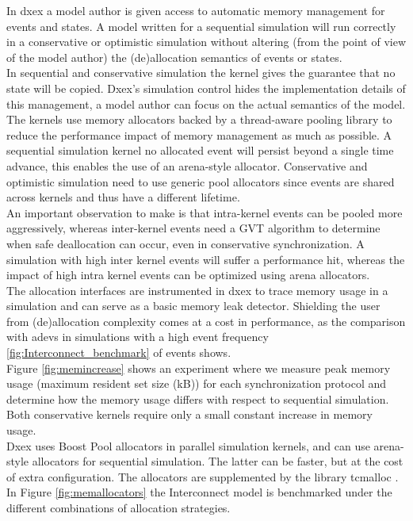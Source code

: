 In dxex a model author is given access to automatic memory management for events and states. A model written for a sequential simulation will run correctly in a conservative or optimistic simulation without altering (from the point of view of the model author) the (de)allocation semantics of events or states. \\
In sequential and conservative simulation the kernel gives the guarantee that no state will be copied. Dxex's simulation control hides the implementation details of this management, a model author can focus on the actual semantics of the model. 
The kernels use memory allocators backed by a thread-aware pooling library to reduce the performance impact of memory management as much as possible. 
A sequential simulation kernel no allocated event will persist beyond a single time advance,  this enables the use of an arena-style allocator. Conservative and optimistic simulation need to use generic pool allocators since events are shared across kernels and thus have a different lifetime. \\
An important observation to make is that intra-kernel events can be pooled more aggressively, whereas inter-kernel events need a GVT algorithm to determine when safe deallocation can occur, even in conservative synchronization. A simulation with high inter kernel events will suffer a performance hit, whereas the impact of high intra kernel events can be optimized using arena allocators.\\
The allocation interfaces are instrumented in dxex to trace memory usage in a simulation and can serve as a basic memory leak detector. Shielding the user from (de)allocation complexity comes at a cost in performance, as the comparison with adevs in simulations with a high event frequency \ref{fig:Interconnect_benchmark} of events shows.\\
Figure \ref{fig:memincrease} shows an experiment where we measure peak memory usage (maximum resident set size (kB)) for each synchronization protocol and determine how the memory usage differs with respect to sequential simulation. Both conservative kernels require only a small constant increase in memory usage. 
\\
Dxex uses Boost Pool\cite{boostpool} allocators in parallel simulation kernels, and can use arena-style allocators for sequential simulation. 
The latter can be faster, but at the cost of extra configuration. The allocators are supplemented by the library tcmalloc \cite{tcmalloc}. In Figure \ref{fig:memallocators} the Interconnect model is benchmarked under the different combinations of allocation strategies. \\
